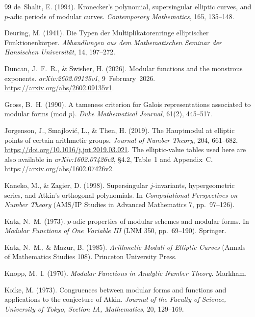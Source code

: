 \documentclass[11pt,a4paper]{article}
\numberwithin{equation}{section}
\theoremstyle{definition}
\theoremstyle{remark}
\begin{document}
\begin{thebibliography}{99}
 de~Shalit, E. (1994). Kronecker's polynomial, supersingular elliptic curves,
and $p$-adic periods of modular curves. \emph{Contemporary Mathematics}, 165, 135--148.

 Deuring, M. (1941). Die Typen der Multiplikatorenringe elliptischer Funktionenk\"orper. \emph{Abhandlungen aus dem Mathematischen Seminar der Hansischen Universit\"at}, 14, 197--272.

 Duncan, J.~F.~R., \& Swisher, H. (2026).
Modular functions and the monstrous exponents. \emph{arXiv:2602.09135v1}, 9~February~2026. \url{https://arxiv.org/abs/2602.09135v1}.

 Gross, B.~H. (1990). A tameness criterion for Galois representations associated to modular forms (mod $p$). \emph{Duke Mathematical Journal}, 61(2), 445--517.

 Jorgenson, J., Smajlovi\'c, L., \& Then, H. (2019).
The Hauptmodul at elliptic points of certain arithmetic groups.
\emph{Journal of Number Theory}, 204, 661--682.
\url{https://doi.org/10.1016/j.jnt.2019.03.021}.
The elliptic-value tables used here are also available in
\emph{arXiv:1602.07426v2}, \S4.2, Table~1 and Appendix~C.
\url{https://arxiv.org/abs/1602.07426v2}.

 Kaneko, M., \& Zagier, D. (1998). Supersingular $j$-invariants,
hypergeometric series, and Atkin's orthogonal polynomials. In \emph{Computational Perspectives on Number
Theory} (AMS/IP Studies in Advanced Mathematics 7, pp.~97--126).

 Katz, N.~M. (1973). $p$-adic properties of modular schemes and modular forms.
In \emph{Modular Functions of One Variable III} (LNM 350, pp.~69--190). Springer.


 Katz, N.~M., \& Mazur, B. (1985). \emph{Arithmetic Moduli of Elliptic
Curves} (Annals of Mathematics Studies 108). Princeton University Press.

 Knopp, M.~I. (1970). \emph{Modular Functions in Analytic Number Theory}. Markham.

 Koike, M. (1973). Congruences between modular forms
and functions and applications to the conjecture of Atkin.
\emph{Journal of the Faculty of Science, University of Tokyo, Section IA, Mathematics},
20, 129--169.


\end{thebibliography}
\end{document}
